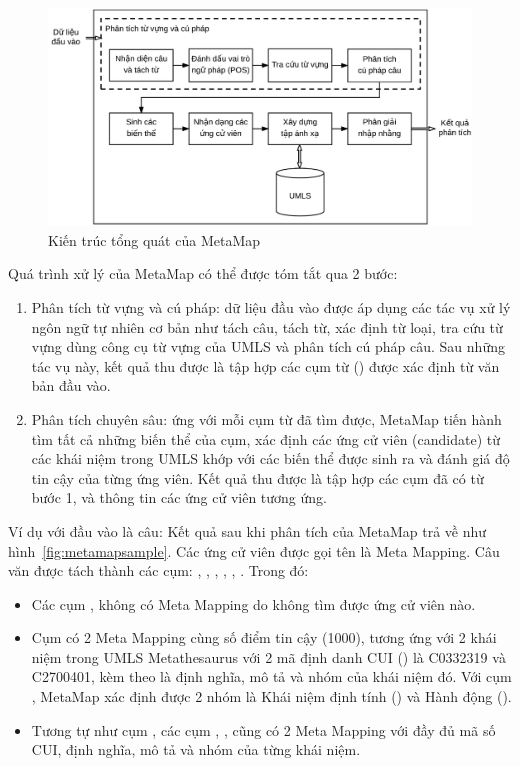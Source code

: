 \begin{figure}[h]
\centering
\includegraphics[scale=0.52]{../hinh/KienTrucMetamap.png}
\caption{Kiến trúc tổng quát của MetaMap \cite{Aronson2010}} \label{fig:kientrucmetamap}
\end{figure}

Quá trình xử lý của MetaMap có thể được tóm tắt qua 2 bước:
\begin{enumerate}
\item Phân tích từ vựng và cú pháp: dữ liệu đầu vào được áp dụng các tác vụ xử lý ngôn ngữ tự nhiên cơ bản như tách câu, tách từ, xác định từ loại, tra cứu từ vựng dùng công cụ từ vựng của UMLS và phân tích cú pháp câu. Sau những tác vụ này, kết quả thu được là tập hợp các cụm từ () được xác định từ văn bản đầu vào.
\item Phân tích chuyên sâu: ứng với mỗi cụm từ đã tìm được, MetaMap tiến hành tìm tất cả những biến thể của cụm, xác định các ứng cử viên (candidate) từ các khái niệm trong UMLS khớp với các biến thể được sinh ra và đánh giá độ tin cậy của từng ứng viên. Kết quả thu được là tập hợp các cụm đã có từ bước 1, và thông tin các ứng cử viên tương ứng.
\end{enumerate}

Ví dụ với đầu vào là câu:  Kết quả sau khi phân tích của MetaMap trả về như hình~\ref{fig:metamapsample}. Các ứng cử viên được gọi tên là Meta Mapping. Câu văn được tách thành các cụm: , , , , , . Trong đó:
\begin{itemize}
\item Các cụm ,  không có Meta Mapping do không tìm được ứng cử viên nào.
\item Cụm  có 2 Meta Mapping cùng số điểm tin cậy (1000), tương ứng với 2 khái niệm trong UMLS Metathesaurus với 2 mã định danh CUI () là C0332319 và C2700401, kèm theo là định nghĩa, mô tả và nhóm của khái niệm đó. Với cụm , MetaMap xác định được 2 nhóm là Khái niệm định tính () và Hành động ().
\item Tương tự như cụm , các cụm , ,  cũng có 2 Meta Mapping với đầy đủ mã số CUI, định nghĩa, mô tả và nhóm của từng khái niệm.
\end{itemize}

